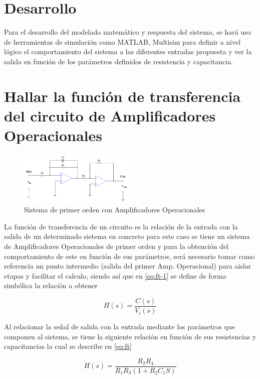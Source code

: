 \documentclass[conference]{IEEEtran}
\begin{document}
	\section{Desarrollo}
	Para el desarrollo del modelado matemático y respuesta del sistema, se hará uso de herramientas de simulación como MATLAB, Multisim para definir a nivel lógico el comportamiento del sistema a las diferentes entradas propuesta y ver la salida en función de los parámetros definidos de resistencia y capacitancia.
	
	
	\section{Hallar la función de transferencia del circuito de Amplificadores Operacionales}
	\begin{figure}
		\centering
		\includegraphics[width=0.5\textwidth]{../INFORME PREVIO/media/circuito-inicial}
		\caption{Sistema de primer orden con Amplificadores Operacionales}
		\label{fig:circuito-inicial}
	\end{figure}
	
	
	La función de transferencia de un circuito es la relación de la entrada con la salida de un determinado sistema en concreto para este caso se tiene un sistema de Amplificadores Operacionales de primer orden y para la obtención del comportamiento de este en función de sus parámetros, será necesario tomar como referencia un punto intermedio (salida del primer Amp. Operacional) para aislar etapas y facilitar el calculo, siendo así que en \ref{eq:ft-1} se define de forma simbólica la relación a obtener
	
	\begin{equation}
		H(s) = \frac{C(s)}{V_i(s)}
		\label{eq:ft-1}
	\end{equation}
	
	Al relacionar la señal de salida con la entrada mediante los parámetros que componen al sistema, se tiene la siguiente relación en función de sus resistencias y capacitancias la cual se describe en \ref{eq:ft}
	
	\begin{equation}
		H(s) = \frac{R_2 R_4}{R_1 R_3(1 + R_2 C_1 S)}
		\label{eq:ft}
	\end{equation}
	
\end{document}
